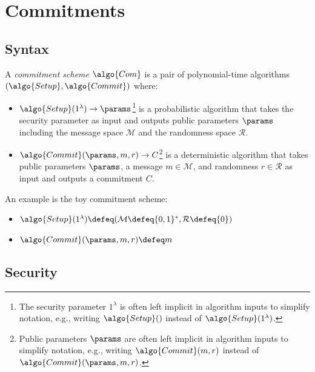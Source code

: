 \section{Commitments}\label{sec:commitments}

\subsection{Syntax}
\begin{definition}
  A \emph{commitment scheme} $\algo{Com}$ is a pair of polynomial-time algorithms $(\algo{Setup}, \algo{Commit})$ where:
  \begin{itemize}
    \item $\algo{Setup}(1^\lambda) \rightarrow \params$\footnote{The security parameter $1^\lambda$ is often left implicit in algorithm inputs to simplify notation, e.g., writing $\algo{Setup}()$ instead of $\algo{Setup}(1^\lambda)$.} is a probabilistic algorithm that takes the security parameter as input and outputs public parameters $\params$ including the message space $\mathcal{M}$ and the randomness space $\mathcal{R}$.
    \item $\algo{Commit}(\params, m, r) \rightarrow C$\footnote{Public parameters $\params$ are often left implicit in algorithm inputs to simplify notation, e.g., writing $\algo{Commit}(m, r)$ instead of $\algo{Commit}(\params, m, r)$.} is a deterministic algorithm that takes public parameters $\params$, a message $m \in \mathcal{M}$, and randomness $r \in \mathcal{R}$ as input and outputs a commitment $C$.
  \end{itemize}
\end{definition}

\begin{example}
  An example is the toy commitment scheme\label{sec:toy-com}:
  \begin{itemize}
    \item $\algo{Setup}(1^\lambda) \defeq (\mathcal{M} \defeq \{0, 1\}^*, \mathcal{R} \defeq \{0\})$
    \item $\algo{Commit}(\params, m, r) \defeq m$
  \end{itemize}
\end{example}

\subsection{Security}

